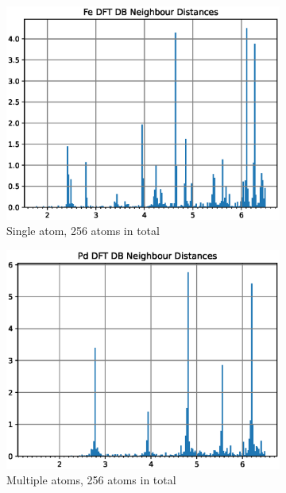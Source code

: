 \begin{figure}
\begin{subfigure}{.32\textwidth}
  \centering
  \includegraphics[width=.94\linewidth]{chapters/potentials_fe_pd_ru/neighbour_distances/db_fe_neighbours.eps}  
  \caption{Single atom, 256 atoms in total}
  \label{fig:sub-first}
\end{subfigure}
\begin{subfigure}{.32\textwidth}
  \centering
  \includegraphics[width=.94\linewidth]{chapters/potentials_fe_pd_ru/neighbour_distances/db_pd_neighbours.eps}  
  \caption{Multiple atoms, 256 atoms in total}
  \label{fig:sub-first}
\end{subfigure}
\begin{subfigure}{.32\textwidth}

\end{subfigure}
\end{figure}
